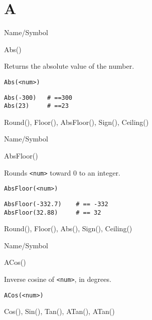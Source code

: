 \rl 

\section{A} 
\rl

\begin{desc}{Name/Symbol}

\item[Name/Symbol] 	Abs()

\item[Description]   	Returns the absolute value of the number.

\item[Usage]
\begin{verbatim}
Abs(<num>)
\end{verbatim}        

\item[Example]
\begin{verbatim}
Abs(-300)  	# ==300
Abs(23)    	# ==23
\end{verbatim}

\item[See Also]     	Round(), Floor(), AbsFloor(), Sign(), Ceiling()
\end{desc}

\rl


\begin{desc}{Name/Symbol}

\item[Name/Symbol]  	AbsFloor()

\item[Description]  	Rounds \verb+<num>+ toward 0 to an integer.

\item[Usage]       	
\begin{verbatim}
AbsFloor(<num>)
\end{verbatim}

\item[Example]
\begin{verbatim}
AbsFloor(-332.7)   	# == -332
AbsFloor(32.88)    	# == 32
\end{verbatim}

\item[See Also]     	Round(), Floor(), Abs(), Sign(), Ceiling()
\end{desc}

\rl


\begin{desc}{Name/Symbol}

\item[Name/Symbol] 	ACos() 

\item[Description]  	Inverse cosine of \verb+<num>+, in degrees.

\item[Usage]
\begin{verbatim}
ACos(<num>)
\end{verbatim}

\item[Example]	

\item[See Also]    	Cos(), Sin(), Tan(), ATan(), ATan() 

\end{desc}

